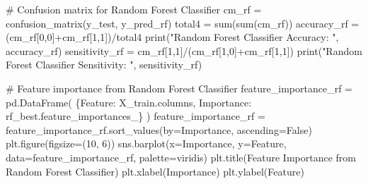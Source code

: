 \documentclass[
  11pt,
  letterpaper,
  DIV=11,
  numbers=noendperiod]{scrartcl}
\newenvironment{Shaded}{\begin{snugshade}}{\end{snugshade}}
\newcommand{\BuiltInTok}[1]{\textcolor[rgb]{0.00,0.23,0.31}{#1}}
\newcommand{\CommentTok}[1]{\textcolor[rgb]{0.37,0.37,0.37}{#1}}
\newcommand{\DecValTok}[1]{\textcolor[rgb]{0.68,0.00,0.00}{#1}}
\newcommand{\NormalTok}[1]{\textcolor[rgb]{0.00,0.23,0.31}{#1}}
\newcommand{\OperatorTok}[1]{\textcolor[rgb]{0.37,0.37,0.37}{#1}}
\newcommand{\StringTok}[1]{\textcolor[rgb]{0.13,0.47,0.30}{#1}}
\newcommand{\VariableTok}[1]{\textcolor[rgb]{0.07,0.07,0.07}{#1}}
\begin{document}
\begin{Shaded}
\begin{Highlighting}[]
\CommentTok{\# Confusion matrix for Random Forest Classifier}
\NormalTok{cm\_rf }\OperatorTok{=}\NormalTok{ confusion\_matrix(y\_test, y\_pred\_rf)}
\NormalTok{total4 }\OperatorTok{=} \BuiltInTok{sum}\NormalTok{(}\BuiltInTok{sum}\NormalTok{(cm\_rf))}
\NormalTok{accuracy\_rf }\OperatorTok{=}\NormalTok{ (cm\_rf[}\DecValTok{0}\NormalTok{,}\DecValTok{0}\NormalTok{]}\OperatorTok{+}\NormalTok{cm\_rf[}\DecValTok{1}\NormalTok{,}\DecValTok{1}\NormalTok{])}\OperatorTok{/}\NormalTok{total4}
\BuiltInTok{print}\NormalTok{(}\StringTok{"Random Forest Classifier Accuracy: "}\NormalTok{, accuracy\_rf)}
\NormalTok{sensitivity\_rf }\OperatorTok{=}\NormalTok{ cm\_rf[}\DecValTok{1}\NormalTok{,}\DecValTok{1}\NormalTok{]}\OperatorTok{/}\NormalTok{(cm\_rf[}\DecValTok{1}\NormalTok{,}\DecValTok{0}\NormalTok{]}\OperatorTok{+}\NormalTok{cm\_rf[}\DecValTok{1}\NormalTok{,}\DecValTok{1}\NormalTok{])}
\BuiltInTok{print}\NormalTok{(}\StringTok{"Random Forest Classifier Sensitivity: "}\NormalTok{, sensitivity\_rf)}

\CommentTok{\# Feature importance from Random Forest Classifier}
\NormalTok{feature\_importance\_rf }\OperatorTok{=}\NormalTok{ pd.DataFrame(}
\NormalTok{    \{}\StringTok{\textquotesingle{}Feature\textquotesingle{}}\NormalTok{: X\_train.columns,}
     \StringTok{\textquotesingle{}Importance\textquotesingle{}}\NormalTok{: rf\_best.feature\_importances\_\}}
\NormalTok{)}
\NormalTok{feature\_importance\_rf }\OperatorTok{=}\NormalTok{ feature\_importance\_rf.sort\_values(by}\OperatorTok{=}\StringTok{\textquotesingle{}Importance\textquotesingle{}}\NormalTok{, ascending}\OperatorTok{=}\VariableTok{False}\NormalTok{)}
\NormalTok{plt.figure(figsize}\OperatorTok{=}\NormalTok{(}\DecValTok{10}\NormalTok{, }\DecValTok{6}\NormalTok{))}
\NormalTok{sns.barplot(x}\OperatorTok{=}\StringTok{\textquotesingle{}Importance\textquotesingle{}}\NormalTok{, y}\OperatorTok{=}\StringTok{\textquotesingle{}Feature\textquotesingle{}}\NormalTok{, data}\OperatorTok{=}\NormalTok{feature\_importance\_rf, palette}\OperatorTok{=}\StringTok{\textquotesingle{}viridis\textquotesingle{}}\NormalTok{)}
\NormalTok{plt.title(}\StringTok{\textquotesingle{}Feature Importance from Random Forest Classifier\textquotesingle{}}\NormalTok{)}
\NormalTok{plt.xlabel(}\StringTok{\textquotesingle{}Importance\textquotesingle{}}\NormalTok{)}
\NormalTok{plt.ylabel(}\StringTok{\textquotesingle{}Feature\textquotesingle{}}\NormalTok{)}
\end{Highlighting}
\end{Shaded}
\end{document}
